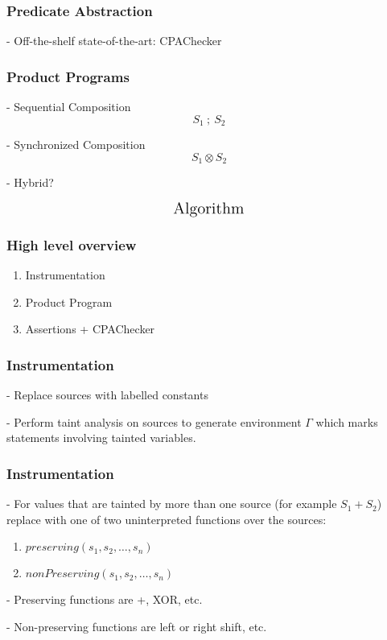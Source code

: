 \documentclass{beamer} %
\theoremstyle{definition} %
\newcommand{\cross}{\otimes{}}
\begin{document}
\begin{frame}
\frametitle{Predicate Abstraction}

	- Off-the-shelf state-of-the-art: CPAChecker

\end{frame}

\begin{frame}
\frametitle{Product Programs}

	- Sequential Composition \[S_1\ ;\ S_2\]

	\pause

	- Synchronized Composition \[S_1 \cross S_2\]

	\pause

	- Hybrid?

\end{frame}

\begin{frame}
	\[\text{\Large{Algorithm}}\]
\end{frame}

\begin{frame}
\frametitle{High level overview}

	\begin{enumerate}
		\item Instrumentation
		\item Product Program
		\item Assertions + CPAChecker
	\end{enumerate}

\end{frame}

\begin{frame}
\frametitle{Instrumentation}
	
	- Replace sources with labelled constants

	- Perform taint analysis on sources to generate environment $\Gamma$ which marks statements involving tainted variables. 

\end{frame}

\begin{frame}
\frametitle{Instrumentation}
	
	- For values that are tainted by more than one source (for example $S_1 + S_2$) replace with one of two uninterpreted functions over the sources: \begin{enumerate}
		\item $preserving(s_1, s_2, \ldots, s_n)$
		\item $nonPreserving(s_1, s_2, \ldots, s_n)$
	\end{enumerate}
	
	- Preserving functions are +, XOR, etc.
	
	- Non-preserving functions are left or right shift, etc.

\end{frame}
\end{document}
